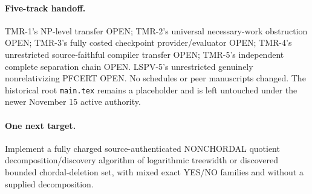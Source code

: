 \documentclass[11pt]{article}
\begin{document}
\paragraph{Five-track handoff.} TMR-1's NP-level transfer OPEN; TMR-2's universal necessary-work obstruction OPEN; TMR-3's fully costed checkpoint provider/evaluator OPEN; TMR-4's unrestricted source-faithful compiler transfer OPEN; TMR-5's independent complete separation chain OPEN. LSPV-5's unrestricted genuinely nonrelativizing PFCERT OPEN. No schedules or peer manuscripts changed. The historical root \texttt{main.tex} remains a placeholder and is left untouched under the newer November 15 active authority.
\paragraph{One next target.} Implement a fully charged source-authenticated NONCHORDAL quotient decomposition/discovery algorithm of logarithmic treewidth or discovered bounded chordal-deletion set, with mixed exact YES/NO families and without a supplied decomposition.
\end{document}
